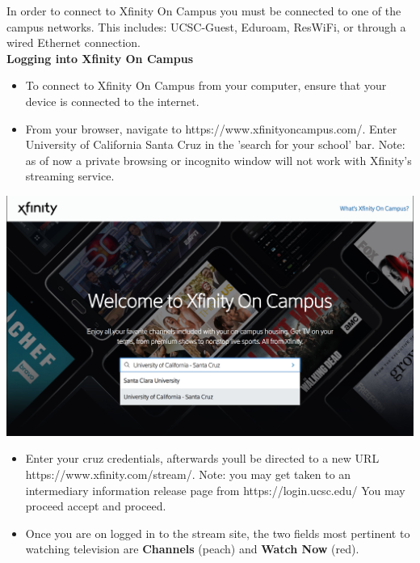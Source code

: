\documentclass[a4paper, 11pt]{article}
\begin{document}
In order to connect to Xfinity On Campus you must be connected to one of the
campus networks.  This includes: UCSC-Guest, Eduroam, ResWiFi, or through a 
wired Ethernet connection.\\
{\newline}
\textbf{Logging into Xfinity On Campus}
\begin{itemize}
  \item To connect to Xfinity On Campus from your computer, ensure that your device  is connected to the internet. 
  \item From your browser, navigate to https://www.xfinityoncampus.com/.  Enter University of California Santa Cruz in the 'search for your school' bar.
  Note: as of now a private browsing or incognito window will not work with
  Xfinity's streaming service.
\end{itemize}
\includegraphics[width=\linewidth, height=\textheight, keepaspectratio]{welcome.png}
\begin{itemize}
  \item Enter your cruz credentials, afterwards youll be directed to a new URL
  https://www.xfinity.com/stream/.  Note: you may get taken to an intermediary
  information release page from 
  https://login.ucsc.edu/  You may proceed accept and proceed.

  \item Once you are on logged in to the stream site, the two fields most
  pertinent to watching television are \textbf{Channels} (peach) and 
  \textbf{Watch Now}
  (red).
\end{itemize}
\end{document}
